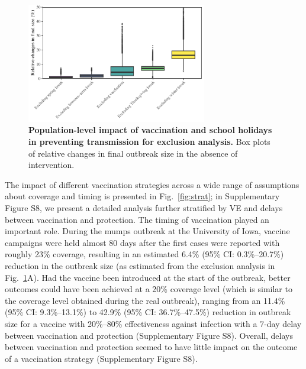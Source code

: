 \documentclass[12pt]{article}
\newcommand{\fref}[1]{Fig.~\ref{fig:#1}}
\begin{document}
\begin{figure}[!th]
\begin{center}
\includegraphics[width=0.7\textwidth]{../figure_stanfit_seirv_final/figure_stanfit_effects_exclusion.pdf}
\caption{
\textbf{Population-level impact of vaccination and school holidays in preventing transmission for exclusion analysis.}
Box plots of relative changes in final outbreak size in the absence of intervention.
}
\label{fig:popimp}
\end{center}
\end{figure}

The impact of different vaccination strategies across a wide range of assumptions about coverage and timing is presented in \fref{strat};
in Supplementary Figure S8, we present a detailed analysis further stratified by VE and delays between vaccination and protection.
The timing of vaccination played an important role.
During the mumps outbreak at the University of Iowa, vaccine campaigns were held almost 80 days after the first cases were reported with roughly 23\% coverage, resulting in an estimated 6.4\% (95\% CI: 0.3\%--20.7\%) reduction in the outbreak size (as estimated from the exclusion analysis in \fref{popimp}A).
Had the vaccine been introduced at the start of the outbreak, better outcomes could have been achieved at a 20\% coverage level (which is similar to the coverage level obtained during the real outbreak), ranging from an 11.4\% (95\% CI: 9.3\%--13.1\%) to 42.9\% (95\% CI: 36.7\%--47.5\%) reduction in outbreak size for a vaccine with 20\%--80\% effectiveness against infection with a 7-day delay between vaccination and protection (Supplementary Figure S8).
Overall, delays between vaccination and protection seemed to have little impact on the outcome of a vaccination strategy (Supplementary Figure S8).
\end{document}
